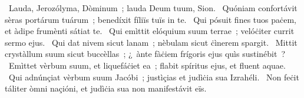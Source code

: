 ~Lauda, Jerozólyma, Dòminum~; lauda Deum tuum, Sion. 
~Quóniam confortávit sèras portárum tuárum~; benedíxit fíliïs tuïs in te. 
~Qui pósuit fines tuos paċem, et àdipe frumènti sátiat te. 
~Qui emìttit elóquium suum terrae~; velóċiter currit sermo ejus. 
~Qui dat nivem sicut lanam~; nèbulam sicut ċìnerem spargit. 
~Mittit crystàllum suum sicut buccèllas~; ¿~ànte fàċiem frígoris ejus quìs sustinébit~? 
~Emìttet vèrbum suum, et liquefáċiet ea~; flabit spíritus ejus, et fluent aquae. 
~Qui adnúnçiat vèrbum suum Jacóbi~; justìçias et judìċia sua Izrahéli. 
~Non feċit táliter òmni naçióni, et judìċia sua non manifestávit eïs. 
